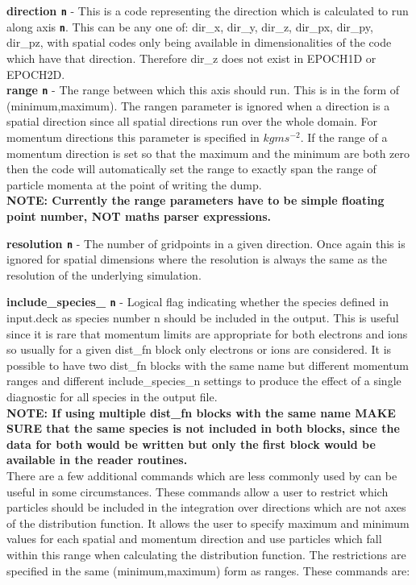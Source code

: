 \documentclass[12pt]{article}
\newcommand{\emphtext}{\color{warwickdark} \fontfamily{phv}\selectfont\Large\bf}
\newcommand{\inlinecode}[1]{{\color{warwickred} \bf\texttt{#1}}}
\begin{document}
{\emphtext direction\inlinecode{n}} - This is a code representing the direction
which is calculated to run along axis \inlinecode{n}. This can be any one of:
dir\_x, dir\_y, dir\_z, dir\_px, dir\_py, dir\_pz, with spatial codes only
being available in dimensionalities of the code which have that
direction. Therefore dir\_z does not exist in EPOCH1D or EPOCH2D.\\

{\emphtext range\inlinecode{n}} - The range between which this axis should
run. This is in the form of (minimum,maximum). The rangen parameter is ignored
when a direction is a spatial direction since all spatial directions run over
the whole domain. For momentum directions this parameter is specified in
$kgms^{-2}$. If the range of a momentum direction is set so that the maximum
and the minimum are both zero then the code will automatically set the range to
exactly span the range of particle momenta at the point of writing the dump.\\

{\emphtext NOTE: Currently the range parameters have to be simple floating
point number, NOT maths parser expressions.}

{\emphtext resolution\inlinecode{n}} - The number of gridpoints in a given
direction. Once again this is ignored for spatial dimensions where the
resolution is always the same as the resolution of the underlying simulation.

{\emphtext include\_species\_\inlinecode{n}} - Logical flag indicating whether
the species defined in input.deck as species number n should be included in the
output. This is useful since it is rare that momentum limits are appropriate
for both electrons and ions so usually for a given dist\_fn block only
electrons or ions are considered. It is possible to have two dist\_fn blocks
with the same name but different momentum ranges and different
include\_species\_n settings to produce the effect of a single diagnostic for
all species in the output file.\\

{\emphtext NOTE: If using multiple dist\_fn blocks with the same name MAKE SURE
that the same species is not included in both blocks, since the data for both
would be written but only the first block would be available in the reader
routines.}\\

There are a few additional commands which are less commonly used by can be
useful in some circumstances. These commands allow a user to restrict which
particles should be included in the integration over directions which are not
axes of the distribution function. It allows the user to specify maximum and
minimum values for each spatial and momentum direction and use particles which
fall within this range when calculating the distribution function. The
restrictions are specified in the same (minimum,maximum) form as ranges. These
commands are:\\
\end{document}
